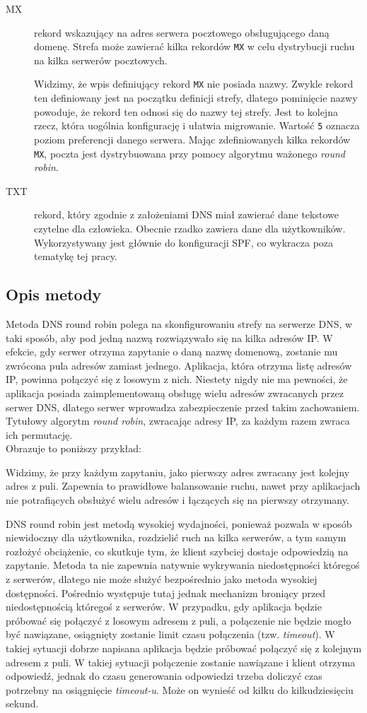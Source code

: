 {\begin{description}
\item[MX] rekord wskazujący na adres serwera pocztowego obsługującego daną domenę.
Strefa może zawierać kilka rekordów \texttt{MX} w celu dystrybucji ruchu na kilka serwerów pocztowych.

Widzimy, że wpis definiujący rekord \texttt{MX} nie posiada nazwy. Zwykle rekord ten definiowany jest na początku definicji strefy, dlatego pominięcie nazwy powoduje, że rekord ten odnosi się do nazwy tej strefy.
Jest to kolejna rzecz, która uogólnia konfigurację i ułatwia migrowanie.
Wartość \texttt{5} oznacza poziom preferencji danego serwera. Mając zdefiniowanych kilka rekordów \texttt{MX}, poczta jest dystrybuowana przy pomocy algorytmu ważonego \textit{round robin}.
\item[TXT] rekord, który zgodnie z założeniami DNS miał zawierać dane tekstowe czytelne dla człowieka.
Obecnie rzadko zawiera dane dla użytkowników. Wykorzystywany jest głównie do konfiguracji SPF, co wykracza poza tematykę tej pracy.
\end{description}
\subsection{Opis metody}
Metoda DNS round robin polega na skonfigurowaniu strefy na serwerze DNS, w taki sposób, aby pod jedną nazwą rozwiązywało się na kilka adresów IP.
W efekcie, gdy serwer otrzyma zapytanie o daną nazwę domenową, zostanie mu zwrócona pula adresów zamiast jednego.
Aplikacja, która otrzyma listę adresów IP, powinna połączyć się z losowym z nich.
Niestety nigdy nie ma pewności, że aplikacja posiada zaimplementowaną obsługę wielu adresów zwracanych przez serwer DNS, dlatego serwer wprowadza zabezpieczenie przed takim zachowaniem. Tytułowy algorytm \textit{round robin}, zwracając adresy IP, za każdym razem zwraca ich permutację.\\

Obrazuje to poniższy przykład:

Widzimy, że przy każdym zapytaniu, jako pierwszy adres zwracany jest kolejny adres z puli. Zapewnia to prawidłowe balansowanie ruchu, nawet przy aplikacjach nie potrafiących obsłużyć wielu adresów i łączących się na pierwszy otrzymany.

DNS round robin jest metodą wysokiej wydajności, ponieważ pozwala w sposób niewidoczny dla użytkownika, rozdzielić ruch na kilka serwerów, a tym samym rozłożyć obciążenie, co skutkuje tym, że klient szybciej dostaje odpowiedzią na zapytanie.
Metoda ta nie zapewnia natywnie wykrywania niedostępności któregoś z serwerów, dlatego nie może służyć bezpośrednio jako metoda wysokiej dostępności.
Pośrednio występuje tutaj jednak mechanizm broniący przed niedostępnością któregoś z serwerów. W przypadku, gdy aplikacja będzie próbować się połączyć z losowym adresem z puli, a połączenie nie będzie mogło być nawiązane, osiągnięty zostanie limit czasu połączenia (tzw. \textit{timeout}). W takiej sytuacji dobrze napisana aplikacja będzie próbować połączyć się z kolejnym adresem z puli.
W takiej sytuacji połączenie zostanie nawiązane i klient otrzyma odpowiedź, jednak do czasu generowania odpowiedzi trzeba doliczyć czas potrzebny na osiągnięcie \textit{timeout-u}. Może on wynieść od kilku do kilkudziesięciu sekund.

}
